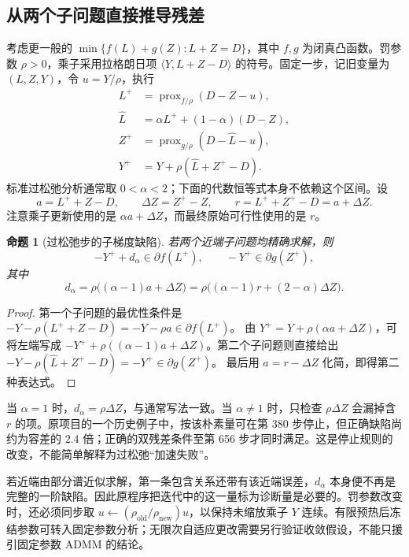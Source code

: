 \documentclass[UTF8,fontset=none,zihao=-4,a4paper]{ctexart}
\theoremstyle{plainzh}
\newtheorem{proposition}{命题}[section]
\newcommand{\ip}[2]{\langle #1,#2\rangle}
\newcommand{\prox}{\operatorname{prox}}
\numberwithin{equation}{section}
\begin{document}
\subsection{从两个子问题直接推导残差}
考虑更一般的 $\min\{f(L)+g(Z):L+Z=D\}$，其中 $f,g$ 为闭真凸函数。罚参数 $\rho>0$，乘子采用拉格朗日项 $\ip Y{L+Z-D}$ 的符号。固定一步，记旧变量为 $(L,Z,Y)$，令 $u=Y/\rho$，执行
\begin{align}
 L^+&=\prox_{f/\rho}(D-Z-u),\\
 \widehat L&=\alpha L^++(1-\alpha)(D-Z),\\
 Z^+&=\prox_{g/\rho}(D-\widehat L-u),\\
 Y^+&=Y+\rho(\widehat L+Z^+-D).
\end{align}
标准过松弛分析通常取 $0<\alpha<2$；下面的代数恒等式本身不依赖这个区间。设
\begin{equation}
 a=L^++Z-D,\qquad \Delta Z=Z^+-Z,\qquad r=L^++Z^+-D=a+\Delta Z.
\end{equation}
注意乘子更新使用的是 $\alpha a+\Delta Z$，而最终原始可行性使用的是 $r$。
\begin{proposition}[过松弛步的子梯度缺陷]\label{prop:relax}
若两个近端子问题均精确求解，则
\begin{equation}\label{eq:incl}
 -Y^++d_\alpha\in\partial f(L^+),\qquad -Y^+\in\partial g(Z^+),
\end{equation}
其中
\begin{equation}\label{eq:dalpha}
 d_\alpha=\rho\bigl((\alpha-1)a+\Delta Z\bigr)
 =\rho\bigl((\alpha-1)r+(2-\alpha)\Delta Z\bigr).
\end{equation}
\end{proposition}
\begin{proof}
第一个子问题的最优性条件是
$-Y-\rho(L^++Z-D)=-Y-\rho a\in\partial f(L^+)$。
由 $Y^+=Y+\rho(\alpha a+\Delta Z)$，可将左端写成
$-Y^++\rho((\alpha-1)a+\Delta Z)$。第二个子问题则直接给出
$-Y-\rho(\widehat L+Z^+-D)=-Y^+\in\partial g(Z^+)$。
最后用 $a=r-\Delta Z$ 化简，即得第二种表达式。
\end{proof}

当 $\alpha=1$ 时，$d_\alpha=\rho\Delta Z$，与通常写法一致。当 $\alpha\ne1$ 时，只检查 $\rho\Delta Z$ 会漏掉含 $r$ 的项。原项目的一个历史例子中，按该朴素量可在第 380 步停止，但正确缺陷尚约为容差的 $2.4$ 倍；正确的双残差条件至第 656 步才同时满足。这是停止规则的改变，不能简单解释为过松弛“加速失败”。

若近端由部分谱近似求解，第一条包含关系还带有该近端误差，$d_\alpha$ 本身便不再是完整的一阶缺陷。因此原程序把迭代中的这一量标为诊断量是必要的。罚参数改变时，还必须同步取 $u\leftarrow(\rho_{\mathrm{old}}/\rho_{\mathrm{new}})u$，以保持未缩放乘子 $Y$ 连续。有限预热后冻结参数可转入固定参数分析；无限次自适应更改需要另行验证收敛假设，不能只援引固定参数 ADMM 的结论\cite{admm}。
\end{document}
